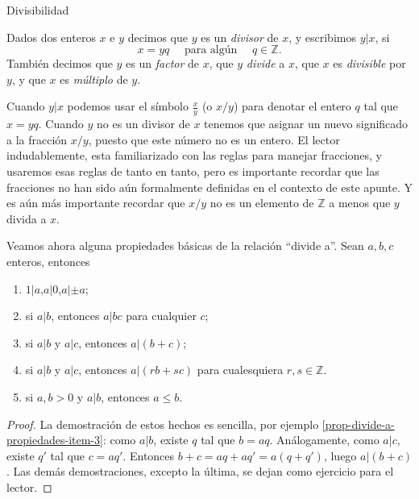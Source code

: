 \begin{section}{Divisibilidad}\label{seccion-divisivilidad}


\begin{definicion}Dados dos enteros $x$ e $y$ decimos que $y$ es un \textit{divisor} de $x$, y escribimos $y|x$, si
$$
x=yq\quad\text{ para algún }\quad q\in \mathbb Z.
$$
También decimos que $y$ es un \textit{factor} de $x$, que $y$ \textit{divide} a $x$, que $x$ es \textit{divisible} por $y$, y que $x$ es \textit{múltiplo} de $y$.
\end{definicion}

Cuando $y|x$ podemos usar el símbolo $\frac{x}{y}$ (o $x/y$) para denotar el entero $q$ tal que $ x=yq$. Cuando $y$ no es un divisor de $x$ tenemos que asignar un nuevo significado a la fracción $x/y$, puesto que este número no es un entero. El lector indudablemente, esta familiarizado con las reglas para manejar
fracciones, y usaremos esas reglas de tanto en tanto, pero es importante recordar que las fracciones no han sido aún formalmente definidas en el contexto de este apunte. Y es aún más importante recordar que $x/y$ no es un elemento de $\mathbb Z$ a menos que $y$ divida a $x$.


\begin{observacion}\label{prop-divide-a-propiedades} Veamos ahora alguna propiedades básicas de la relación ``divide a''. Sean $a,b,c$ enteros, entonces
\begin{enumerate}[label=\textit{\alph*)}]
\item\label{prop-divide-a-propiedades-item-1} $1|a$,\qquad $a|0$,\qquad $a|\pm a$;
\item\label{prop-divide-a-propiedades-item-2} si $a|b$, entonces $a|bc$ para cualquier $c$;
\item\label{prop-divide-a-propiedades-item-3} si $a|b$ y $a|c$, entonces $a|(b+c)$;
\item\label{prop-divide-a-propiedades-item-4} si $a|b$ y $a|c$, entonces $a|(rb+sc)$ para cualesquiera $r,s \in \mathbb Z$.
\item\label{prop-divide-a-propiedades-item-5} si $a, b >0$ y $a|b$, entonces $a \le b$.
\end{enumerate}
\begin{proof}
La demostración de estos hechos es sencilla, por ejemplo \ref{prop-divide-a-propiedades-item-3}: como $a|b$, existe $q$ tal que $b = aq$. Análogamente, como $a|c$, existe $q'$ tal que $c = aq'$. Entonces $b+c = aq+aq' = a(q+q')$, luego $a|(b+c)$.  
Las demás demostraciones,  excepto la última, se dejan como ejercicio para el lector. 


\end{proof}
\end{observacion}
\end{section}
